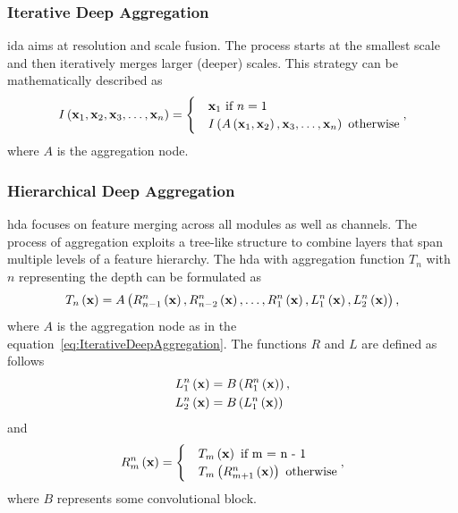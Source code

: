 \subsubsection{Iterative Deep Aggregation}

\gls{ida} aims at resolution and scale fusion. The process starts at the smallest scale and then iteratively merges larger (deeper) scales. This strategy can be mathematically described as
\begin{equation}
  \label{eq:IterativeDeepAggregation}
  {I} \left( \mathbf{x}_1, \mathbf{x}_2, \mathbf{x}_3, \dots, \mathbf{x}_n \right) =
  \begin{cases}
     & \mathbf{x}_1 \text{ if } n = 1                                                                \\
     & {I} \left( {A} \left( \mathbf{x}_1, \mathbf{x}_2 \right), \mathbf{x}_3, \dots, \mathbf{x}_n \right) \text{ otherwise}
  \end{cases},
\end{equation}
where $A$ is the aggregation node.

\subsubsection{Hierarchical Deep Aggregation}

\gls{hda} focuses on feature merging across all modules as well as channels. The process of aggregation exploits a tree-like structure to combine layers that span multiple levels of a feature hierarchy. The \gls{hda} with aggregation function $T_n$ with $n$ representing the depth can be formulated as
\begin{equation}
  \label{eq:HierarchicalDeepAggregation}
  {T_n} \left( \mathbf{x} \right) =
  {A} \left( 
    {{R}_{n - 1}^{n}} \left( \mathbf{x} \right),
    {{R}_{n - 2}^{n}} \left( \mathbf{x} \right),
    \dots,
    {{R}_{1}^{n}} \left( \mathbf{x} \right),
    {{L}_{1}^{n}} \left( \mathbf{x} \right),
    {{L}_{2}^{n}} \left( \mathbf{x} \right)
   \right),
\end{equation}
where $A$ is the aggregation node as in the equation~\ref{eq:IterativeDeepAggregation}. The functions $R$ and $L$ are defined as follows
\begin{equation}
  \label{eq:HDAConvBlocksL}
  \begin{aligned}
     & {{L}_{1}^{n}} \left( \mathbf{x} \right) = {B} \left( {{R}_{1}^{n}} \left( \mathbf{x} \right) \right), \\
     & {{L}_{2}^{n}} \left( \mathbf{x} \right) = {B} \left( {{L}_{1}^{n}} \left( \mathbf{x} \right) \right)
  \end{aligned}
\end{equation}
and
\begin{equation}
  \label{eq:DLAConvBlocksR}
  \func{\subsup{R}{m}{n}}{\vect{x}} =
  \begin{cases}
     & \func{T_m}{\vect{x}} \text{ if } $m = n - 1$                        \\
     & \func{T_m}{\func{\subsup{R}{m + 1}{n}}{\vect{x}}} \text{ otherwise}
  \end{cases},
\end{equation}
where $B$ represents some convolutional block.

